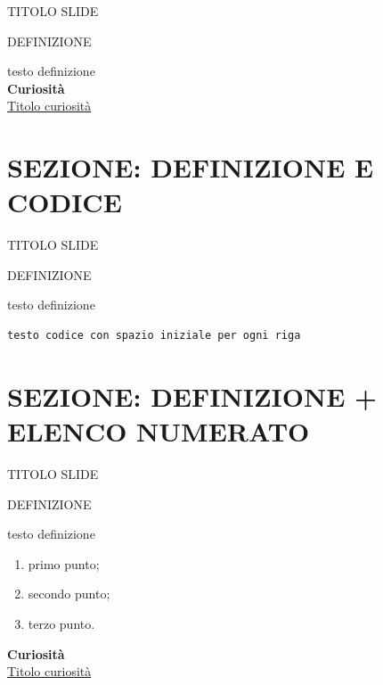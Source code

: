\documentclass[aspectratio=1610]{beamer}
\begin{document}
\begin{frame}{TITOLO SLIDE}
    \begin{alertblock}{DEFINIZIONE}
        \begin{minipage}{0.98\linewidth}
            \justifying
            testo definizione\\
            \bigskip
            \tiny{\textbf{Curiosità}}\\
            \tiny{\href{www.link.com}{Titolo curiosità}}
        \end{minipage}
    \end{alertblock}
\end{frame}

\section{SEZIONE: DEFINIZIONE E CODICE}

\begin{frame}[fragile]{TITOLO SLIDE}
    \begin{alertblock}{DEFINIZIONE}
        \begin{minipage}{0.98\linewidth}
            \justifying
            testo definizione\\
            \bigskip
\begin{lstlisting}[language=Python]
 testo codice con spazio iniziale per ogni riga
\end{lstlisting}
        \end{minipage}
    \end{alertblock}
\end{frame}

\section{SEZIONE: DEFINIZIONE + ELENCO NUMERATO}

\begin{frame}{TITOLO SLIDE}
    \begin{alertblock}{DEFINIZIONE}
        \begin{minipage}{0.98\linewidth}
            \justifying
            testo definizione\\
            \bigskip
            \begin{enumerate}
                \pause
                \item primo punto;
                \pause
                \item secondo punto;
                \pause
                \item terzo punto. 
            \end{enumerate}
            \bigskip
            \tiny{\textbf{Curiosità}}\\
            \tiny{\href{www.link.com}{Titolo curiosità}}        
        \end{minipage}
    \end{alertblock}
\end{frame}
\end{document}
